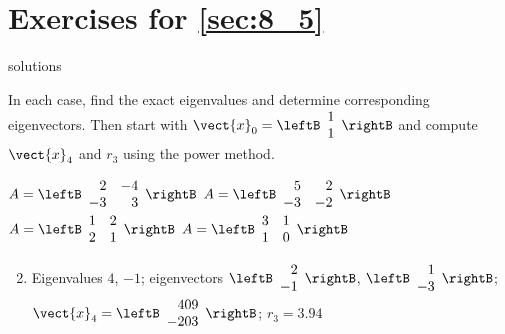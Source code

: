 
\section*{Exercises for \ref{sec:8_5}}

\begin{Filesave}{solutions}
\end{Filesave}

\begin{multicols}{2}
\begin{ex}
In each case, find the exact eigenvalues and determine corresponding eigenvectors. Then start with $\vect{x}_{0} = \leftB \begin{array}{rr}
1  \\
1
\end{array}\rightB$ and compute $\vect{x}_{4}$ and $r_{3}$ using the power method.


\begin{exenumerate}
\exitem $A = \leftB \begin{array}{rr}
2 & -4 \\
-3 & 3
\end{array}\rightB$
\exitem $A = \leftB \begin{array}{rr}
5 & 2 \\
-3 & -2
\end{array}\rightB$
\exitem $A = \leftB \begin{array}{rr}
1 & 2 \\
2 & 1
\end{array}\rightB$
\exitem $A = \leftB \begin{array}{rr}
3 & 1 \\
1 & 0
\end{array}\rightB$
\end{exenumerate}
\begin{sol}
\begin{enumerate}[label={\alph*.}]
\setcounter{enumi}{1}
\item Eigenvalues $4$, $-1$; eigenvectors 
$\leftB \begin{array}{rr}
2  \\
-1
\end{array}\rightB$,
$\leftB \begin{array}{rr}
1 \\
-3
\end{array}\rightB$;
$\vect{x}_{4} = \leftB \begin{array}{rr}
409  \\
-203
\end{array}\rightB$;
$r_{3} = 3.94$


\end{enumerate}
\end{sol}
\end{ex}
\end{multicols}
